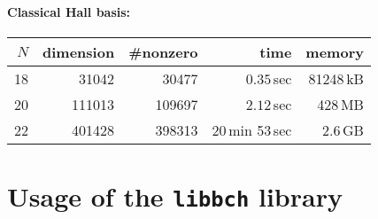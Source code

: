 \documentclass[11pt,a4paper]{article}
\begin{document}
\paragraph{Classical Hall basis:}
\begin{center}
\begin{tabular}{rrrrr}
\hline
$N$ & dimension & \#nonzero & time  & memory \\
\hline
18 & 31042 & 30477   & $0.35$\,sec & 81248\,kB\\
20 & 111013 & 109697 & $2.12$\,sec & 428\,MB \\
22 & 401428 & 398313 & 20\,min 53\,sec & 2.6\,GB\\
\hline
\end{tabular}
\end{center}

\section{Usage of the {\tt libbch} library}
\end{document}

